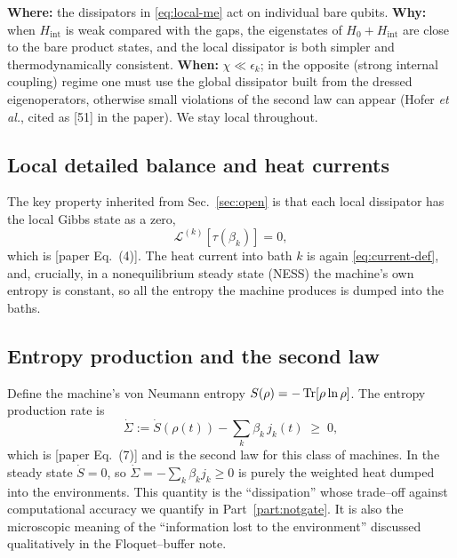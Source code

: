 \documentclass[11pt,a4paper]{article}
\newcommand{\calL}{\mathcal{L}}
\theoremstyle{definition}
\theoremstyle{remark}
\begin{document}
\begin{approxbox}
\textbf{Where:} the dissipators in \eqref{eq:local-me} act on individual
bare qubits. \textbf{Why:} when $H_{\mathrm{int}}$ is weak compared with
the gaps, the eigenstates of $H_0+H_{\mathrm{int}}$ are close to the bare
product states, and the local dissipator is both simpler and
thermodynamically consistent. \textbf{When:} $\chi \ll \epsilon_k$; in
the opposite (strong internal coupling) regime one must use the global
dissipator built from the dressed eigenoperators, otherwise small
violations of the second law can appear (Hofer \emph{et al.}, cited as
[51] in the paper). We stay local throughout.
\end{approxbox}

\subsection{Local detailed balance and heat currents}
The key property inherited from Sec.~\ref{sec:open} is that each local
dissipator has the local Gibbs state as a zero,
\begin{equation}
\calL^{(k)}[\tau(\beta_k)] = 0 ,
\label{eq:ldb}
\end{equation}
which is [paper Eq.~(4)]. The heat current into bath $k$ is again
\eqref{eq:current-def}, and, crucially, in a nonequilibrium steady state
(NESS) the machine's own entropy is constant, so all the entropy the
machine produces is dumped into the baths.

\subsection{Entropy production and the second law}
Define the machine's von Neumann entropy $S(\rho) = -\Tr[\rho\ln\rho]$.
The entropy production rate is
\begin{equation}
\dot\Sigma := \dot S(\rho(t)) - \sum_k \beta_k\, j_k(t) \;\ge\; 0,
\label{eq:entropy-prod}
\end{equation}
which is [paper Eq.~(7)] and is the second law for this class of
machines. In the steady state $\dot S = 0$, so
$\dot\Sigma = -\sum_k\beta_k j_k \ge 0$ is purely the weighted heat
dumped into the environments. This quantity is the ``dissipation'' whose
trade--off against computational accuracy we quantify in
Part~\ref{part:notgate}. It is also the microscopic meaning of the
``information lost to the environment'' discussed qualitatively in the
Floquet--buffer note.
\end{document}
